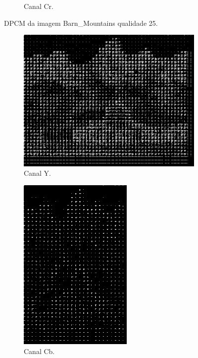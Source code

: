 \documentclass[a4paper, 12pt]{article}
\begin{document}
\begin{figure}[H]
\begin{subfigure}{0.3\textwidth}
                \caption{ Canal Cr.}
            \end{subfigure}
            \caption{\label{fig:my_label} DPCM da imagem Barn\_Mountains qualidade 25.}
        \end{figure}
        \begin{figure}[H]
            \begin{subfigure}{0.3\textwidth}
                \centering
                \includegraphics[scale=0.5] {resources/DPCM/Y_DPCM50.png}
                \caption{ Canal Y.}
            \end{subfigure}
            \hfill
            \begin{subfigure}{0.3\textwidth}
                \centering 
                \includegraphics[scale=0.5]{resources/DPCM/CB_DPCM50.png}
                \caption{ Canal Cb.}
            \end{subfigure}
            \hfill
            \begin{subfigure}{0.3\textwidth}

\end{subfigure}
\end{figure}
\end{document}
